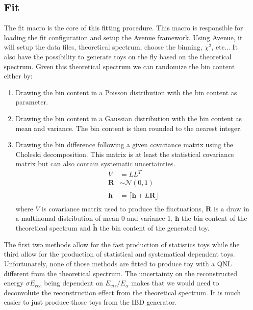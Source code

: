 \documentclass[../main.tex]{subfiles}
\begin{document}
%

\subsection{Fit}
\label{sec:joint_fit:framework:fit}

The fit macro is the core of this fitting procedure. This macro is responsible for loading the fit configuration and setup the Avenue framework. Using Avenue, it will setup the data files, theoretical spectrum, choose the binning, $\chi^2$, etc... It also have the possibility to generate toys on the fly based on the theoretical spectrum. Given this theoretical spectrum we can randomize the bin content either by:
\begin{enumerate}
  \item Drawing the bin content in a Poisson distribution with the bin content as parameter.
  \item Drawing the bin content in a Gaussian distribution with the bin content as mean and variance. The bin content is then rounded to the nearest integer.
  \item Drawing the bin difference following a given covariance matrix using the Choleski decomposition. This matrix is at least the statistical covariance matrix but can also contain systematic uncertainties.
    \begin{align}
      V &= LL^T \\
      \mathbf{R} &\sim \mathcal{N}(0, 1) \\
      \tilde{\mathbf{h}} &= \lceil \mathbf{h} + L\mathbf{R} \rfloor \\
    \end{align}
    where $V$ is covariance matrix used to produce the fluctuations, $\mathbf{R}$ is a draw in a multinomal distribution of mean 0 and variance 1, $\mathbf{h}$ the bin content of the theoretical spectrum and $\tilde{\mathbf{h}}$ the bin content of the generated toy.
\end{enumerate}

The first two methods allow for the fast production of statistics toys while the third allow for the production of statistical and systematical dependent toys. Unfortunately, none of those methods are fitted to produce toy with a QNL different from the theoretical spectrum. The uncertainty on the reconstructed energy $\sigma E_{rec}$ being dependent on $E_{vis}/E_{\alpha}$ makes that we would need to deconvolute the reconstruction effect from the theoretical spectrum. It is much easier to just produce those toys from the IBD generator.
\end{document}

